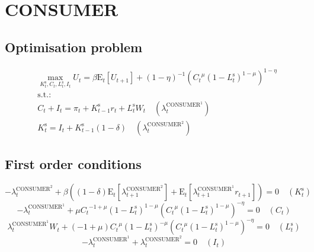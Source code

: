 

\section{CONSUMER}

\subsection{Optimisation problem}

\begin{align}
&\max_{K^{\mathrm{s}}_{t}, C_{t}, L^{\mathrm{s}}_{t}, I_{t}
} U_{t} = {\beta} {\mathrm{E}_{t}\left[U_{t+1}\right]} + \left(1 - \eta\right)^{-1} {\left({{C_{t}}^{\mu}} {\left(1 - L^{\mathrm{s}}_{t}\right)^{1 - \mu}}\right)^{1 - \eta}}\\
&\mathrm{s.t.:}\nonumber\\
& C_{t} + I_{t} = \pi_{t} + {K^{\mathrm{s}}_{t-1}} {r_{t}} + {L^{\mathrm{s}}_{t}} {W_{t}} \quad \left(\lambda^{\mathrm{CONSUMER}^{\mathrm{1}}}_{t}\right)\\
& K^{\mathrm{s}}_{t} = I_{t} + {K^{\mathrm{s}}_{t-1}} \left(1 - \delta\right) \quad \left(\lambda^{\mathrm{CONSUMER}^{\mathrm{2}}}_{t}\right)
\end{align}


\subsection{First order conditions}

\begin{equation}
-\lambda^{\mathrm{CONSUMER}^{\mathrm{2}}}_{t} + {\beta} \left(\left(1 - \delta\right) {\mathrm{E}_{t}\left[\lambda^{\mathrm{CONSUMER}^{\mathrm{2}}}_{t+1}\right]} + \mathrm{E}_{t}\left[{\lambda^{\mathrm{CONSUMER}^{\mathrm{1}}}_{t+1}} {r_{t+1}}\right]\right) = 0
 \quad \left(K^{\mathrm{s}}_{t}\right)
\end{equation}
\begin{equation}
-\lambda^{\mathrm{CONSUMER}^{\mathrm{1}}}_{t} + {\mu} {{C_{t}}^{-1 + \mu}} {\left(1 - L^{\mathrm{s}}_{t}\right)^{1 - \mu}} {\left({{C_{t}}^{\mu}} {\left(1 - L^{\mathrm{s}}_{t}\right)^{1 - \mu}}\right)^{-\eta}} = 0
 \quad \left(C_{t}\right)
\end{equation}
\begin{equation}
{\lambda^{\mathrm{CONSUMER}^{\mathrm{1}}}_{t}} {W_{t}} + \left(-1 + \mu\right) {{C_{t}}^{\mu}} {\left(1 - L^{\mathrm{s}}_{t}\right)^{-\mu}} {\left({{C_{t}}^{\mu}} {\left(1 - L^{\mathrm{s}}_{t}\right)^{1 - \mu}}\right)^{-\eta}} = 0
 \quad \left(L^{\mathrm{s}}_{t}\right)
\end{equation}
\begin{equation}
-\lambda^{\mathrm{CONSUMER}^{\mathrm{1}}}_{t} + \lambda^{\mathrm{CONSUMER}^{\mathrm{2}}}_{t} = 0
 \quad \left(I_{t}\right)
\end{equation}




